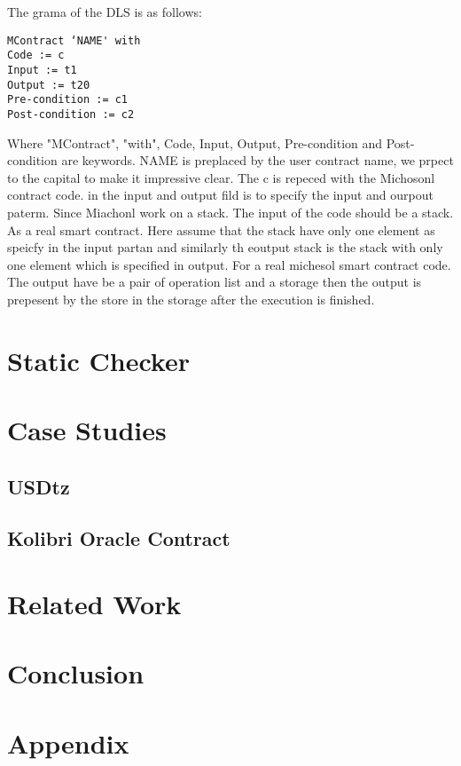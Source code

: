 \documentclass[a4paper,UKenglish,cleveref, autoref, thm-restate]{lipics-v2021}
\begin{document}
The grama of the DLS is as follows:

\begin{verbatim}
MContract ‘NAME' with
Code := c
Input := t1
Output := t20
Pre-condition := c1
Post-condition := c2
\end{verbatim}

Where "MContract", "with", Code, Input, Output, Pre-condition and Post-condition are keywords. NAME is preplaced by the user contract name, we prpect to the capital to make it impressive clear. The c is repeced with the Michosonl contract code. in the input and output fild is to specify the input and ourpout paterm. Since Miachonl work on a stack. The input of the code should be a stack. As a real smart contract. Here assume that the stack have only one element as speicfy in the input partan and similarly th eoutput stack is the stack with only one element which is specified in output. For a real michesol smart contract code. The output have be a pair of operation list and a storage then the output is prepesent by the store in the storage after the execution is finished. 

\section {Static Checker}

\section {Case Studies}
\subsection{USDtz}
\subsection{Kolibri Oracle Contract}
\section {Related Work}
\section {Conclusion}
\section {Appendix}
\end{document}
